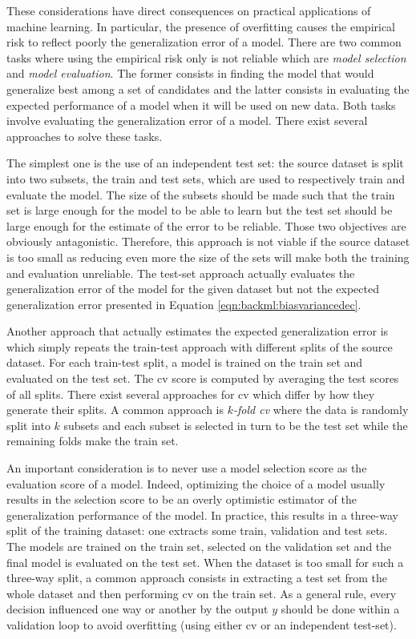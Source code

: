 These considerations have direct consequences on practical applications of machine
learning. In particular, the presence of overfitting causes the empirical risk to
reflect poorly the generalization error of a model. There are two common tasks
where using the empirical risk only is not reliable which are \textit{model selection}
and \textit{model evaluation}. The former consists in finding the model that would
generalize best among a set of candidates and the latter consists in evaluating
the expected performance of a model when it will be used on new data. Both tasks
involve evaluating the generalization error of a model. There exist several approaches
to solve these tasks.

The simplest one is the use of an independent test set: the source dataset is
split into two subsets, the train and test sets, which are used to respectively
train and evaluate the model. The size of the subsets should be made such that
the train set is large enough for the model to be able to learn but the test set
should be large enough for the estimate of the error to be reliable. Those two
objectives are obviously antagonistic. Therefore, this approach is not viable if
the source dataset is too small as reducing even more the size of the sets will
make both the training and evaluation unreliable. The test-set approach actually
evaluates the generalization error of the model for the given dataset but not the
expected generalization error presented in Equation \ref{eqn:backml:biasvariancedec}.

Another approach that actually estimates the expected generalization error is
 which simply repeats the train-test approach with different splits
of the source dataset. For each train-test split, a model is trained on the train
set and evaluated on the test set. The \acrlong{cv} score is computed by averaging
the test scores of all splits. There exist several approaches for \acrlong{cv}
which differ by how they generate their splits. A common approach is
\textit{$k$-fold \acrlong{cv}} where the data is randomly split into $k$ subsets
and each subset is selected in turn to be the test set while the remaining folds
make the train set.

An important consideration is to never use a model selection score as the evaluation
score of a model. Indeed, optimizing the choice of a model usually results in the
selection score to be an overly optimistic estimator of the generalization
performance of the model. In practice, this results in a three-way split of the
training dataset: one extracts some train, validation and test sets. The models
are trained on the train set, selected on the validation set and the final model
is evaluated on the test set. When the dataset is too small for such a three-way
split, a common approach consists in extracting a test set from the whole dataset
and then performing \acrlong{cv} on the train set. As a general rule, every decision
influenced one way or another by the output $y$ should be done within a validation
loop to avoid overfitting (using either \acrlong{cv} or an independent
test-set).


